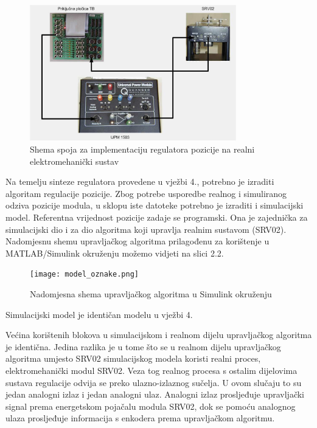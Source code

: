 \documentclass[12pt,a4paper]{article}
\begin{document}
\begin{figure}[h]
	\begin{center}
	\includegraphics[width=0.8\textwidth] {shema_spoj.png}
    \caption{Shema spoja za implementaciju regulatora pozicije na realni elektromehanički sustav}
    \end{center}
\end{figure}

Na temelju sinteze regulatora provedene u vježbi 4., potrebno je izraditi algoritam regulacije pozicije. Zbog potrebe usporedbe realnog i simuliranog odziva pozicije modula, u sklopu iste datoteke potrebno je izraditi i simulacijski model. Referentna vrijednost pozicije zadaje se programski. Ona je zajednička za simulacijski dio i za dio algoritma koji upravlja realnim sustavom (SRV02). Nadomjesnu shemu upravljačkog algoritma prilagođenu za korištenje u MATLAB/Simulink okruženju možemo vidjeti na slici 2.2.

\begin{figure}[h]
	\begin{center}
	\texttt{[image: model\_oznake.png]}
    \caption{Nadomjesna shema upravljačkog algoritma u Simulink okruženju}
    \end{center}
\end{figure}

Simulacijski model je identičan modelu u vježbi 4. 

Većina korištenih blokova u simulacijskom i realnom dijelu upravljačkog algoritma je identična. Jedina razlika je u tome što se u realnom dijelu upravljačkog algoritma umjesto SRV02 simulacijskog modela koristi realni proces, elektromehanički modul SRV02. Veza tog realnog procesa s ostalim dijelovima sustava regulacije odvija se preko ulazno-izlaznog sučelja. U ovom slučaju to su jedan analogni izlaz i jedan analogni ulaz. Analogni izlaz prosljeđuje
upravljački signal prema energetskom pojačalu modula SRV02, dok se pomoću analognog ulaza prosljeđuje informacija s enkodera prema upravljačkom algoritmu.
\end{document}
